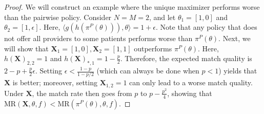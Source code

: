 \documentclass[11pt]{article}
\DeclareMathOperator*{\argmax}{arg\,max}
\begin{document}
\begin{proof}
     
    We will construct an example where the unique maximizer performs worse than the pairwise policy. 
    Consider $N=M=2$, and let $\theta_{1} = [1,0]$ and $\theta_{2} = [1,\epsilon]$. 
    Here, $\langle g(h(\pi^{P}(\theta))),\theta \rangle = 1+\epsilon$. 
    Note that any policy that does not offer all providers to some patients performs worse than $\pi^{P}(\theta)$. 
    Next, we will show that $\mathbf{X}_{1} = [1,0], \mathbf{X}_{2} = [1,1]$ outperforms $\pi^{P}(\theta)$. 
    Here, $h(\mathbf{X})_{2,2} = 1$ and $h(\mathbf{X})_{*,1} = 1-\frac{p}{2}$. 
    Therefore, the expected match quality is $2-p+\frac{p}{2}\epsilon$. 
    Setting $\epsilon < \frac{1-p}{1-p/2}$ (which can always be done when $p<1$) yields that $\mathbf{X}$ is better; moreover, setting $\mathbf{X}_{1,2} = 1$ can only lead to a worse match quality. 
    Under $\mathbf{X}$, the match rate then goes from $p$ to $p-\frac{p^2}{4}$, showing that $\mathrm{MR}(\mathbf{X},\theta,f) < \mathrm{MR}(\pi^{P}(\theta),\theta,f)$. 
\end{proof}


%      
\end{document}
